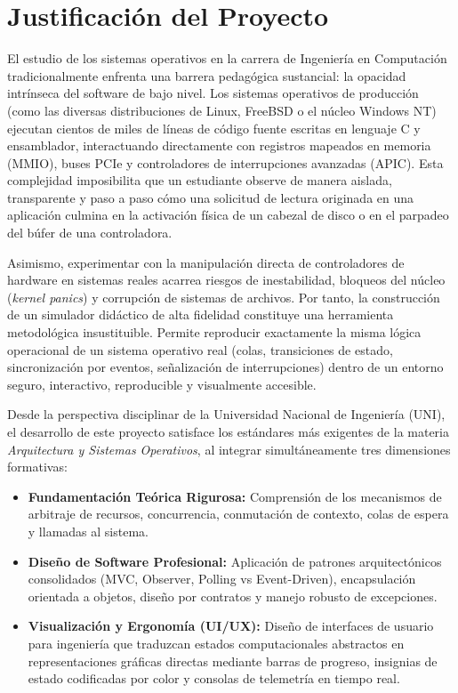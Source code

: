 \documentclass[11pt,letterpaper]{article}
\begin{document}
\section{Justificación del Proyecto}

El estudio de los sistemas operativos en la carrera de Ingeniería en Computación tradicionalmente enfrenta una barrera pedagógica sustancial: la opacidad intrínseca del software de bajo nivel. Los sistemas operativos de producción (como las diversas distribuciones de Linux, FreeBSD o el núcleo Windows NT) ejecutan cientos de miles de líneas de código fuente escritas en lenguaje C y ensamblador, interactuando directamente con registros mapeados en memoria (MMIO), buses PCIe y controladores de interrupciones avanzadas (APIC). Esta complejidad imposibilita que un estudiante observe de manera aislada, transparente y paso a paso cómo una solicitud de lectura originada en una aplicación culmina en la activación física de un cabezal de disco o en el parpadeo del búfer de una controladora.

Asimismo, experimentar con la manipulación directa de controladores de hardware en sistemas reales acarrea riesgos de inestabilidad, bloqueos del núcleo (\textit{kernel panics}) y corrupción de sistemas de archivos. Por tanto, la construcción de un simulador didáctico de alta fidelidad constituye una herramienta metodológica insustituible. Permite reproducir exactamente la misma lógica operacional de un sistema operativo real (colas, transiciones de estado, sincronización por eventos, señalización de interrupciones) dentro de un entorno seguro, interactivo, reproducible y visualmente accesible.

Desde la perspectiva disciplinar de la Universidad Nacional de Ingeniería (UNI), el desarrollo de este proyecto satisface los estándares más exigentes de la materia \textit{Arquitectura y Sistemas Operativos}, al integrar simultáneamente tres dimensiones formativas:
\begin{itemize}
    \item \textbf{Fundamentación Teórica Rigurosa:} Comprensión de los mecanismos de arbitraje de recursos, concurrencia, conmutación de contexto, colas de espera y llamadas al sistema.
    \item \textbf{Diseño de Software Profesional:} Aplicación de patrones arquitectónicos consolidados (MVC, Observer, Polling vs Event-Driven), encapsulación orientada a objetos, diseño por contratos y manejo robusto de excepciones.
    \item \textbf{Visualización y Ergonomía (UI/UX):} Diseño de interfaces de usuario para ingeniería que traduzcan estados computacionales abstractos en representaciones gráficas directas mediante barras de progreso, insignias de estado codificadas por color y consolas de telemetría en tiempo real.
\end{itemize}
\end{document}
